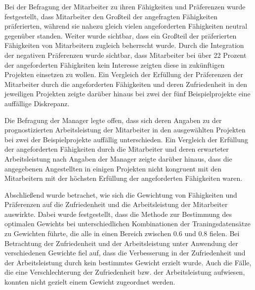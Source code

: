 Bei der Befragung der Mitarbeiter zu ihren Fähigkeiten und Präferenzen wurde festgestellt, dass Mitarbeiter den Großteil der angefragten Fähigkeiten präferierten, während sie nahezu gleich vielen angeforderten Fähigkeiten neutral gegenüber standen.
Weiter wurde sichtbar, dass ein Großteil der präferierten Fähigkeiten von Mitarbeitern zugleich beherrscht wurde.
Durch die Integration der negativen Präferenzen wurde sichtbar, dass Mitarbeiter bei über 22 Prozent der angeforderten Fähigkeiten kein Interesse zeigten diese in zukünftigen Projekten einsetzen zu wollen.
Ein Vergleich der Erfüllung der Präferenzen der Mitarbeiter durch die angeforderten Fähigkeiten und deren Zufriedenheit in den jeweiligen Projekten zeigte darüber hinaus bei zwei der fünf Beispielprojekte eine auffällige Diskrepanz.

Die Befragung der Manager legte offen, dass sich deren Angaben zu der prognostizierten Arbeitsleistung der Mitarbeiter in den ausgewählten Projekten bei zwei der Beispielprojekte auffällig unterschieden. 
Ein Vergleich der Erfüllung der angeforderten Fähigkeiten durch die Mitarbeiter und deren erwarteter Arbeitsleistung nach Angaben der Manager zeigte darüber hinaus, dass die angegebenen Angestellten in einigen Projekten nicht kongruent mit den Mitarbeitern mit der höchsten Erfüllung der angeforderten Fähigkeiten waren.

Abschließend wurde betrachet, wie sich die Gewichtung von Fähigkeiten und Präferenzen auf die Zufriedenheit und die Arbeitsleistung der Mitarbeiter auswirkte.
Dabei wurde festgestellt, dass die Methode zur Bestimmung des optimalen Gewichts bei unterschiedlichen Kombinationen der Traningsdatensätze zu Gewichten führte, die alle in einen Bereich zwischen 0.6 und 0.8 fielen.
Bei Betrachtung der Zufriedenheit und der Arbeitsleistung unter Anwendung der verschiedenen Gewichte fiel auf, dass die Verbesserung in der Zufriedenheit und der Arbeitsleistung durch kein bestimmtes Gewicht erzielt wurde.
Auch die Fälle, die eine Verschlechterung der Zufriedenheit bzw. der Arbeitsleistung aufwiesen, konnten nicht gezielt einem Gewicht zugeordnet werden.

